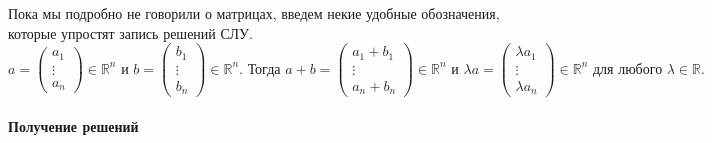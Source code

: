 Пока мы подробно не говорили о матрицах, введем некие удобные обозначения, которые упростят запись решений СЛУ.
\[
a=
\begin{pmatrix}
{a_1}\\{\vdots}\\{a_n}
\end{pmatrix}
\in\mathbb R^n
\text{ и }
b=
\begin{pmatrix}
{b_1}\\{\vdots}\\{b_n}
\end{pmatrix}
\in\mathbb R^n.
\text{ Тогда }
a + b =
\begin{pmatrix}
{a_1 + b_1}\\{\vdots}\\{a_n + b_n}
\end{pmatrix}
\in\mathbb R^n
\text{ и }
\lambda a =
\begin{pmatrix}
{\lambda a_1}\\{\vdots}\\{\lambda a_n}
\end{pmatrix}
\in\mathbb R^n\text{ для любого }\lambda\in\mathbb R.
\]

\paragraph{Получение решений}

